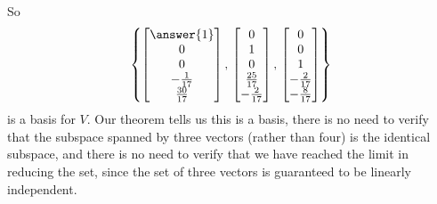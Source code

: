 \documentclass{ximera}
\begin{document}
\begin{example}
  So
  \[
    \set{
      \colvector{\answer{1}\\0\\0\\-\frac{1}{17}\\\frac{30}{17}},\,
      \colvector{0\\1\\0\\\frac{25}{17}\\-\frac{2}{17}},\,
      \colvector{0\\0\\1\\-\frac{2}{17}\\-\frac{8}{17}}
    }
  \]
  is a basis for $V$.  Our theorem tells us this is a basis, there is
  no need to verify that the subspace spanned by three vectors (rather
  than four) is the identical subspace, and there is no need to verify
  that we have reached the limit in reducing the set, since the set of
  three vectors is guaranteed to be linearly independent.

\end{example}
\end{document}
